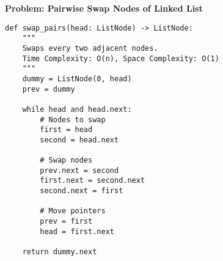 \noindent\textbf{Problem: Pairwise Swap Nodes of Linked List}
\begin{verbatim}
def swap_pairs(head: ListNode) -> ListNode:
    """
    Swaps every two adjacent nodes.
    Time Complexity: O(n), Space Complexity: O(1)
    """
    dummy = ListNode(0, head)
    prev = dummy
    
    while head and head.next:
        # Nodes to swap
        first = head
        second = head.next
        
        # Swap nodes
        prev.next = second
        first.next = second.next
        second.next = first
        
        # Move pointers
        prev = first
        head = first.next
    
    return dummy.next
\end{verbatim}

